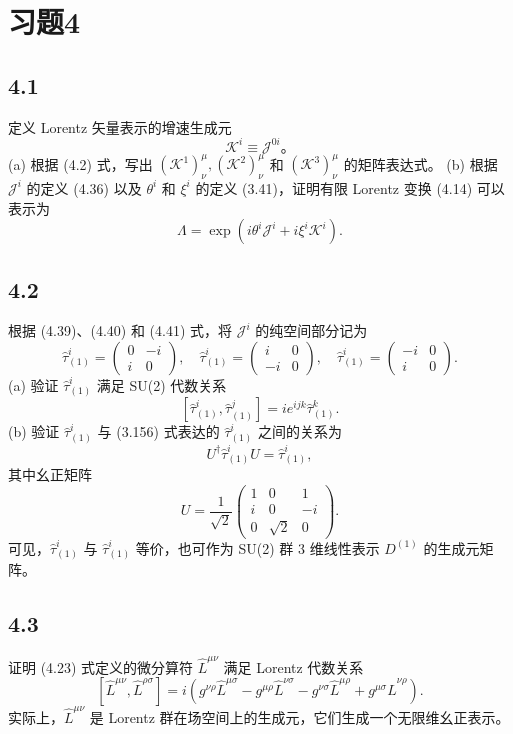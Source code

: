 \section{习题4}

\newpage
\subsection{4.1}
定义 Lorentz 矢量表示的增速生成元
$$\mathcal{K}^{i} \equiv \mathcal{J}^{0i}。$$
(a) 根据 (4.2) 式，写出 $(\mathcal{K}^{1})^{\mu}_{\nu}, (\mathcal{K}^{2})^{\mu}_{\nu}$ 和 $(\mathcal{K}^{3})^{\mu}_{\nu}$ 的矩阵表达式。
(b) 根据 $ \mathcal{J}^i $ 的定义 (4.36) 以及 $ \theta^i $ 和 $ \xi^i $ 的定义 (3.41)，证明有限 Lorentz 变换 (4.14) 可以表示为
$$\Lambda = \exp(i\theta^i \mathcal{J}^i + i\xi^i \mathcal{K}^i).$$

\newpage
\subsection{4.2}
根据 (4.39)、(4.40) 和 (4.41) 式，将 $ \mathcal{J}^i $ 的纯空间部分记为
$$\hat{\tau}_{(1)}^i = 
\begin{pmatrix}
0 & -i \\
i & 0
\end{pmatrix}, \quad \hat{\tau}_{(1)}^i = 
\begin{pmatrix}
i & 0 \\
-i & 0
\end{pmatrix}, \quad \hat{\tau}_{(1)}^i = 
\begin{pmatrix}
-i & 0 \\
i & 0
\end{pmatrix}.$$
(a) 验证 $\hat{\tau}_{(1)}^i$ 满足 SU(2) 代数关系
$$[\hat{\tau}_{(1)}^i, \hat{\tau}_{(1)}^j] = i e^{ijk} \hat{\tau}_{(1)}^k.$$
(b) 验证 $\hat{\tau}_{(1)}^i$ 与 (3.156) 式表达的 $\hat{\tau}_{(1)}^i$ 之间的关系为
$$U^{\dagger} \hat{\tau}_{(1)}^i U = \hat{\tau}_{(1)}^i,$$
其中幺正矩阵
$$U = \frac{1}{\sqrt{2}} 
\begin{pmatrix}
1 & 0 & 1 \\
i & 0 & -i \\
0 & \sqrt{2} & 0
\end{pmatrix}.$$
可见，$\hat{\tau}_{(1)}^i$ 与 $\hat{\tau}_{(1)}^i$ 等价，也可作为 SU(2) 群 3 维线性表示 $D^{(1)}$ 的生成元矩阵。

\newpage
\subsection{4.3}
证明 (4.23) 式定义的微分算符 $\hat{L}^{\mu\nu}$ 满足 Lorentz 代数关系
$$[\hat{L}^{\mu\nu}, \hat{L}^{\rho\sigma}] = i(g^{\nu\rho} \hat{L}^{\mu\sigma} - g^{\mu\rho} \hat{L}^{\nu\sigma} - g^{\nu\sigma} \hat{L}^{\mu\rho} + g^{\mu\sigma} \hat{L}^{\nu\rho}).$$
实际上，$\hat{L}^{\mu\nu}$ 是 Lorentz 群在场空间上的生成元，它们生成一个无限维幺正表示。


